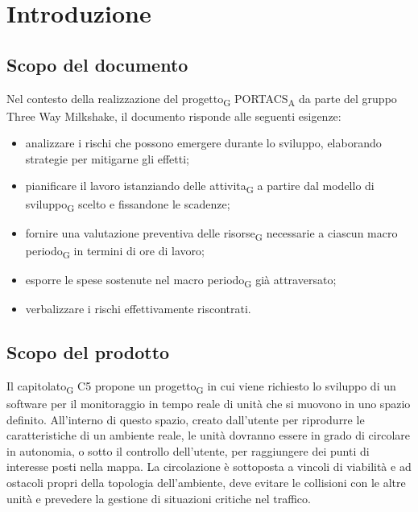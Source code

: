 \section{Introduzione}




\subsection{Scopo del documento}

Nel contesto della realizzazione del progetto\textsubscript{G} PORTACS\textsubscript{A} da parte del gruppo Three Way Milkshake, il documento risponde alle seguenti esigenze:
\begin{itemize}
	\item analizzare i rischi che possono emergere durante lo sviluppo, elaborando strategie per mitigarne gli effetti;
	\item pianificare il lavoro istanziando delle attivita\textsubscript{G} a partire dal modello di sviluppo\textsubscript{G} scelto e fissandone le scadenze;
	\item fornire una valutazione preventiva delle risorse\textsubscript{G} necessarie a ciascun macro periodo\textsubscript{G} in termini di ore di lavoro;
	\item esporre le spese sostenute nel macro periodo\textsubscript{G} già attraversato;
	\item verbalizzare i rischi effettivamente riscontrati.
\end{itemize}



\subsection{Scopo del prodotto}

Il capitolato\textsubscript{G} C5 propone un progetto\textsubscript{G} in cui viene richiesto lo sviluppo di un software per il monitoraggio in tempo reale di unità che si muovono in uno spazio definito. All’interno di questo spazio, creato dall’utente per riprodurre le caratteristiche di un ambiente reale, le unità dovranno essere in grado di circolare in autonomia, o sotto il controllo dell’utente, per raggiungere dei punti di interesse posti nella mappa.  La circolazione è sottoposta a vincoli di viabilità e ad ostacoli propri della topologia dell’ambiente, deve evitare le collisioni con le altre unità e prevedere la gestione di situazioni critiche nel traffico.




